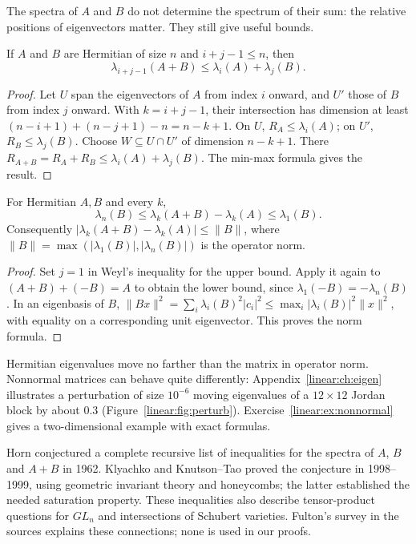 The spectra of $A$ and $B$ do not determine the spectrum of their sum: the relative positions of eigenvectors matter. They still give useful bounds.

\begin{theorem}[Weyl, 1912]\label{linear:thm:weyl}
If $A$ and $B$ are Hermitian of size $n$ and $i+j-1\le n$, then
\[\lambda_{i+j-1}(A+B)\le\lambda_i(A)+\lambda_j(B).\]
\end{theorem}
\begin{proof}
Let $U$ span the eigenvectors of $A$ from index $i$ onward, and $U'$ those of $B$ from index $j$ onward. With $k=i+j-1$, their intersection has dimension at least $(n-i+1)+(n-j+1)-n=n-k+1$. On $U$, $R_A\le\lambda_i(A)$; on $U'$, $R_B\le\lambda_j(B)$. Choose $W\subseteq U\cap U'$ of dimension $n-k+1$. There $R_{A+B}=R_A+R_B\le\lambda_i(A)+\lambda_j(B)$. The min-max formula gives the result.
\end{proof}

\begin{corollary}\label{linear:cor:weylpert}
For Hermitian $A,B$ and every $k$,
\[\lambda_n(B)\le\lambda_k(A+B)-\lambda_k(A)\le\lambda_1(B).\]
Consequently $|\lambda_k(A+B)-\lambda_k(A)|\le\|B\|$, where $\|B\|=\max(|\lambda_1(B)|,|\lambda_n(B)|)$ is the operator norm.
\end{corollary}
\begin{proof}
Set $j=1$ in Weyl's inequality for the upper bound. Apply it again to $(A+B)+(-B)=A$ to obtain the lower bound, since $\lambda_1(-B)=-\lambda_n(B)$. In an eigenbasis of $B$, $\|Bx\|^2=\sum_i\lambda_i(B)^2|c_i|^2\le\max_i|\lambda_i(B)|^2\|x\|^2$, with equality on a corresponding unit eigenvector. This proves the norm formula.
\end{proof}

Hermitian eigenvalues move no farther than the matrix in operator norm. Nonnormal matrices can behave quite differently: Appendix~\ref{linear:ch:eigen} illustrates a perturbation of size $10^{-6}$ moving eigenvalues of a $12\times12$ Jordan block by about $0.3$ (Figure~\ref{linear:fig:perturb}). Exercise~\ref{linear:ex:nonnormal} gives a two-dimensional example with exact formulas.

\begin{remark}
Horn conjectured a complete recursive list of inequalities for the spectra of $A$, $B$ and $A+B$ in 1962. Klyachko and Knutson--Tao proved the conjecture in 1998--1999, using geometric invariant theory and honeycombs; the latter established the needed saturation property. These inequalities also describe tensor-product questions for $GL_n$ and intersections of Schubert varieties. Fulton's survey in the sources explains these connections; none is used in our proofs.
\end{remark}


